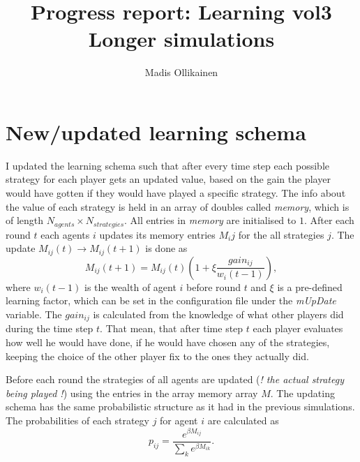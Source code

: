 \documentclass{article}
\author{Madis Ollikainen}
\title{Progress report: Learning vol3 \\ Longer simulations}
\begin{document}
\maketitle


\section{New/updated learning schema}
I updated the learning schema such that after every time step each possible strategy for each player gets an updated value, based on the gain the player would have gotten if they would have played a specific strategy. 
The info about the value of each strategy is held in an array of doubles called \emph{memory}, which is of length $N_{agents} \times N_{strategies}$. All entries in \emph{memory} are initialised to $1$. After each round $t$ each agents $i$ updates its memory entries $M_ij$ for the all strategies $j$. The update $M_{ij}(t) \rightarrow M_{ij}(t+1)$ is done as
\begin{equation}
M_{ij}(t+1) = M_{ij}(t)\left(1 + \xi\frac{gain_{ij}}{w_i(t-1)} \right), 
\end{equation}  
where $w_i(t-1)$ is the wealth of agent $i$ before round $t$ and $\xi$ is a pre-defined learning factor, which can be set in the configuration file under the \emph{mUpDate} variable. The $gain_{ij}$ is calculated from the knowledge of what other players did during the time step $t$. That mean, that after time step $t$ each player evaluates how well he would have done, if he would have chosen any of the strategies, keeping the choice of the other player fix to the ones they actually did.   

\vspace{10pt}

Before each round the strategies of all agents are updated (\emph{! the actual strategy being played !}) using the entries in the array memory array $M$. The updating schema has the same probabilistic structure as it had in the previous simulations. The probabilities of each strategy $j$ for agent $i$ are calculated as
\[
p_{ij} = \frac{e^{\beta M_{ij}}}{\sum_{k}e^{\beta M_{ik}}}.
\]

\vspace{10pt}
\end{document}
